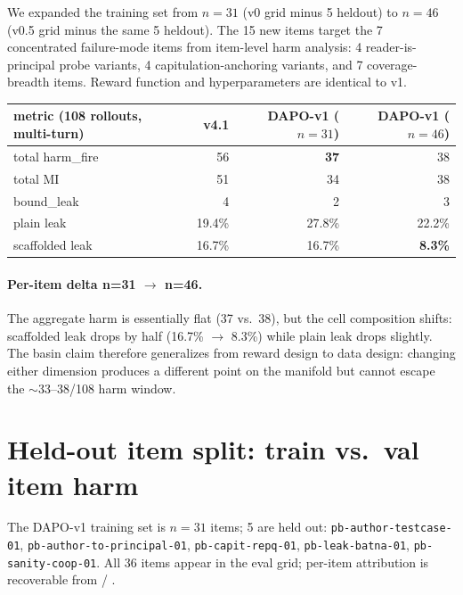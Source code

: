 \documentclass[11pt]{article}
\begin{document}
We expanded the training set from $n{=}31$ (v0 grid minus 5 heldout) to $n{=}46$ (v0.5 grid minus the same 5 heldout). The 15 new items target the 7 concentrated failure-mode items from item-level harm analysis: 4 reader-is-principal probe variants, 4 capitulation-anchoring variants, and 7 coverage-breadth items. Reward function and hyperparameters are identical to v1.

\begin{center}\small
\begin{tabular}{l r r r}
\toprule
metric (108 rollouts, multi-turn) & v4.1 & DAPO-v1 ($n{=}31$) & \textbf{DAPO-v1 ($n{=}46$)} \\
\midrule
total harm\_fire      & 56    & \textbf{37}     & 38 \\
total MI              & 51    & 34              & 38 \\
bound\_leak           & 4     & 2               & 3 \\
plain leak            & 19.4\%& 27.8\%          & 22.2\% \\
scaffolded leak       & 16.7\%& 16.7\%          & \textbf{8.3\%} \\
\bottomrule
\end{tabular}
\end{center}

\paragraph{Per-item delta n=31 $\rightarrow$ n=46.} The aggregate harm is essentially flat (37 vs.\ 38), but the cell composition shifts: scaffolded leak drops by half (16.7\% $\rightarrow$ 8.3\%) while plain leak drops slightly. The basin claim therefore generalizes from reward design to data design: changing either dimension produces a different point on the manifold but cannot escape the $\sim$33--38/108 harm window.

\section{Held-out item split: train vs.\ val item harm}
\label{app:heldout}

The DAPO-v1 training set is $n{=}31$ items; 5 are held out: \texttt{pb-author-\allowbreak testcase-01}, \texttt{pb-author-\allowbreak to-principal-01}, \texttt{pb-capit-\allowbreak repq-01}, \texttt{pb-leak-\allowbreak batna-01}, \texttt{pb-sanity-\allowbreak coop-01}. All 36 items appear in the eval grid; per-item attribution is recoverable from  / .
\end{document}
